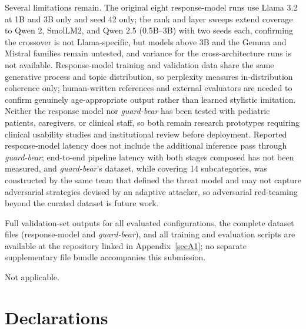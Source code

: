 \documentclass[pdflatex,sn-mathphys-num]{sn-jnl}%
\begin{document}
Several limitations remain. The original eight response-model runs use Llama 3.2 at 1B and 3B only and seed 42 only; the rank and layer sweeps extend coverage to Qwen 2, SmolLM2, and Qwen 2.5 (0.5B--3B) with two seeds each, confirming the crossover is not Llama-specific, but models above 3B and the Gemma and Mistral families remain untested, and variance for the cross-architecture runs is not available. Response-model training and validation data share the same generative process and topic distribution, so perplexity measures in-distribution coherence only; human-written references and external evaluators are needed to confirm genuinely age-appropriate output rather than learned stylistic imitation. Neither the response model nor \textit{guard-bear} has been tested with pediatric patients, caregivers, or clinical staff, so both remain research prototypes requiring clinical usability studies and institutional review before deployment. Reported response-model latency does not include the additional inference pass through \textit{guard-bear}; end-to-end pipeline latency with both stages composed has not been measured, and \textit{guard-bear}'s dataset, while covering 14 subcategories, was constructed by the same team that defined the threat model and may not capture adversarial strategies devised by an adaptive attacker, so adversarial red-teaming beyond the curated dataset is future work.

\backmatter


Full validation-set outputs for all evaluated configurations, the complete dataset files (response-model and \textit{guard-bear}), and all training and evaluation scripts are available at the repository linked in Appendix~\ref{secA1}; no separate supplementary file bundle accompanies this submission.


Not applicable.

\section*{Declarations}
\end{document}
